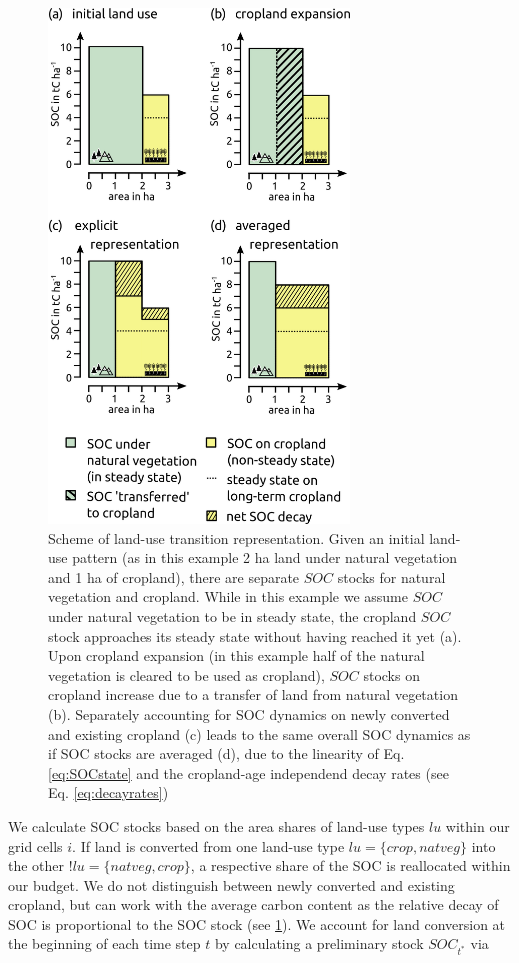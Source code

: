 \documentclass[gc, manuscript]{copernicus}
\begin{document}
\begin{figure}[h]
\includegraphics[width=8cm]{../ResultNotebooks/Output/Images/LUtransitions} \caption{Scheme of land-use transition representation. 
Given an initial land-use pattern (as in this example 2 ha land under natural vegetation and 1 ha of cropland), there are separate $SOC$ stocks for natural vegetation and cropland. While in this example we assume $SOC$ under natural vegetation to be in steady state, the cropland $SOC$ stock approaches its steady state without having reached it yet (a). Upon cropland expansion (in this example half of the natural vegetation is cleared to be used as cropland), $SOC$ stocks on cropland increase due to a transfer of land from natural vegetation (b). Separately accounting for SOC dynamics on newly converted and existing cropland (c) leads to the same overall SOC dynamics as if SOC stocks are averaged (d), due to the linearity of Eq. \ref{eq:SOCstate} and the cropland-age independend decay rates (see Eq. \ref{eq:decayrates})}\label{fig:LUtrans}
\end{figure}

We calculate SOC stocks based on the area shares of land-use types \(lu\) within our grid cells \(i\). If land is converted from one land-use type \(lu=\{crop,natveg\}\) into the other \(!lu=\{natveg,crop\}\), a respective share of the SOC is reallocated within our budget. We do not distinguish between newly converted and existing cropland, but can work with the average carbon content as the relative decay of SOC is proportional to the SOC stock (see \ref{fig:LUtrans}). We account for land conversion at the beginning of each time step \(t\) by calculating a preliminary stock \(SOC_{t^*}\) via
\end{document}
